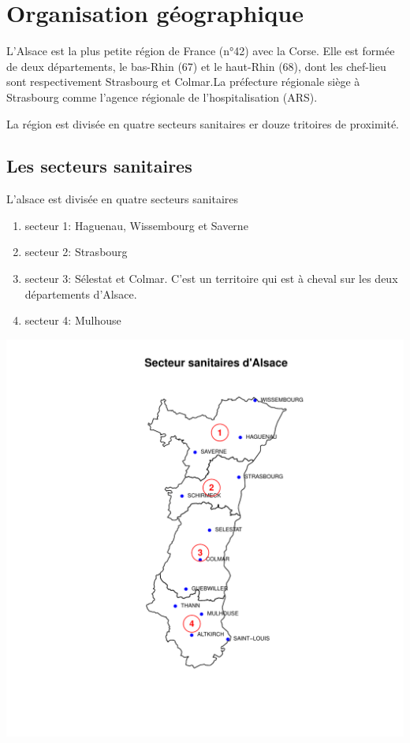 \documentclass[12pt,english,french,twoside]{report}\usepackage[]{graphicx}\usepackage[]{color}
\makeatletter
\def\maxwidth{ %
  \ifdim\Gin@nat@width>\linewidth
    \linewidth
  \else
    \Gin@nat@width
  \fi
}
\newenvironment{knitrout}{}{} %
\makeatother
\begin{document}
\chapter{Organisation géographique}


L'Alsace est la plus petite région de France (n°42) avec la Corse. Elle est formée de deux départements, le bas-Rhin (67) et le haut-Rhin (68), dont les chef-lieu sont respectivement Strasbourg et Colmar.La préfecture régionale siège à Strasbourg comme l'agence régionale de l'hospitalisation  (ARS).

La région est divisée en quatre secteurs sanitaires er douze tritoires de proximité.

\section{Les secteurs sanitaires}

L'alsace est divisée en quatre secteurs sanitaires
\begin{enumerate}
  \item secteur 1: Haguenau, Wissembourg et Saverne
  \item secteur 2: Strasbourg
  \item secteur 3: Sélestat et Colmar. C'est un territoire qui est à cheval sur les deux départements d'Alsace.
  \item secteur 4: Mulhouse
\end{enumerate}

\begin{knitrout}
\color{fgcolor}
\includegraphics[width=\maxwidth]{figure/carte_secteurs_sanitaires} 

\end{knitrout}
\end{document}
